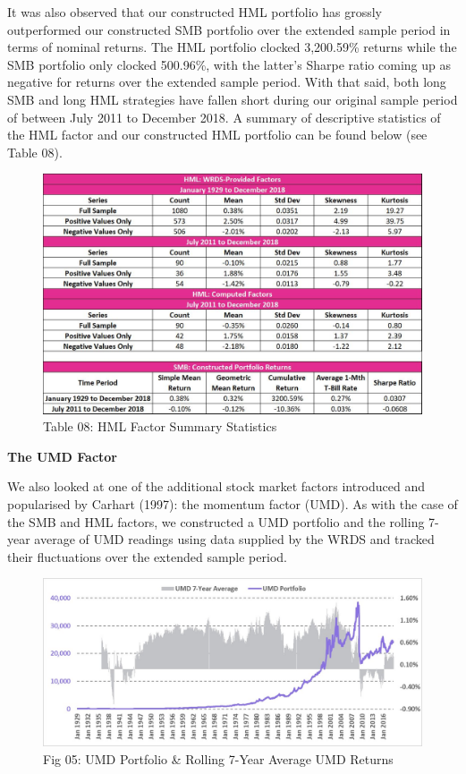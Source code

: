 \documentclass[12pt]{article}
\begin{document}
\noindent It was also observed that our constructed HML portfolio has grossly outperformed our constructed SMB portfolio over the extended sample period in terms of nominal returns. The HML portfolio clocked 3,200.59\% returns while the SMB portfolio only clocked 500.96\%, with the latter's Sharpe ratio coming up as negative for returns over the extended sample period. With that said, both long SMB and long HML strategies have fallen short during our original sample period of between July 2011 to December 2018. A summary of descriptive statistics of the HML factor and our constructed HML portfolio can be found below (see Table 08).

\begin{figure}[h]
	\centering
	\includegraphics[width=0.8\linewidth]{HML03}
	\caption*{Table 08: HML Factor Summary Statistics}
	\label{fig:label}
\end{figure}

\newpage

\noindent \textbf{The UMD Factor}

\noindent We also looked at one of the additional stock market factors introduced and popularised by Carhart (1997): the momentum factor (UMD). As with the case of the SMB and HML factors, we constructed a UMD portfolio and the rolling 7-year average of UMD readings using data supplied by the WRDS and tracked their fluctuations over the extended sample period.

\begin{figure}[h]
	\centering
	\includegraphics[width=0.9\linewidth]{UMD01}
	\caption*{Fig 05: UMD Portfolio \& Rolling 7-Year Average UMD Returns}
	\label{fig:label}
\end{figure}
\end{document}
